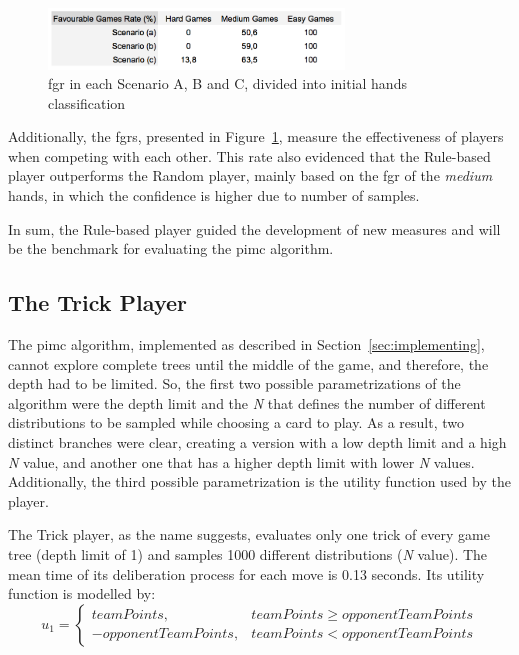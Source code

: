 \begin{figure}[h!]
  \centering
    \includegraphics[width=0.7\textwidth]{./img/4/ABC-fgr}
  \caption{\ac{fgr} in each Scenario A, B and C, divided into initial hands classification}
\label{fig:ABC-fgr}
\end{figure}

Additionally, the \acp{fgr}, presented in Figure~\ref{fig:ABC-fgr}, measure the effectiveness of players when competing with each other.
This rate also evidenced that the Rule-based player outperforms the Random player, mainly based on the \ac{fgr} of the \emph{medium} hands, in which the confidence is higher due to number of samples.

In sum, the Rule-based player guided the development of new measures and will be the benchmark for evaluating the \ac{pimc} algorithm.


\subsection{The Trick Player}

The \ac{pimc} algorithm, implemented as described in Section~\ref{sec:implementing}, cannot explore complete trees until the middle of the game, and therefore, the depth had to be limited.
So, the first two possible parametrizations of the algorithm were the depth limit and the \emph{N} that defines the number of different distributions to be sampled while choosing a card to play.
As a result, two distinct branches were clear, creating a version with a low depth limit and a high \emph{N} value, and another one that has a higher depth limit with lower \emph{N} values.
Additionally, the third possible parametrization is the utility function used by the player.

The Trick player, as the name suggests, evaluates only one trick of every game tree (depth limit of 1) and samples 1000 different distributions (\emph{N} value).
The mean time of its deliberation process for each move is 0.13 seconds.
Its utility function is modelled by:
\begin{equation} \label{eq:uf1}
u_1 = \left\{
                \begin{array}{ll}
                  teamPoints, & teamPoints \geq opponentTeamPoints\\
                  - opponentTeamPoints, & teamPoints < opponentTeamPoints
                \end{array}
              \right.
\end{equation}

